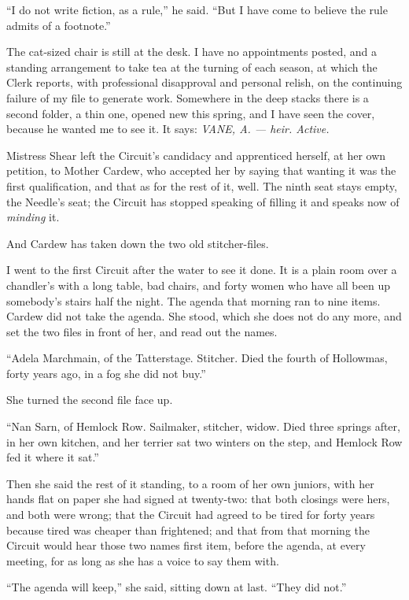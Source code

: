 ``I do not write fiction, as a rule,'' he said. ``But I have come to believe the rule admits of a footnote.''

The cat-sized chair is still at the desk. I have no appointments posted, and a standing arrangement to take tea at the turning of each season, at which the Clerk reports, with professional disapproval and personal relish, on the continuing failure of my file to generate work. Somewhere in the deep stacks there is a second folder, a thin one, opened new this spring, and I have seen the cover, because he wanted me to see it. It says: \emph{VANE, A. --- heir. Active.}

Mistress Shear left the Circuit's candidacy and apprenticed herself, at her own petition, to Mother Cardew, who accepted her by saying that wanting it was the first qualification, and that as for the rest of it, well. The ninth seat stays empty, the Needle's seat; the Circuit has stopped speaking of filling it and speaks now of \emph{minding} it.

And Cardew has taken down the two old stitcher-files.

I went to the first Circuit after the water to see it done. It is a plain room over a chandler's with a long table, bad chairs, and forty women who have all been up somebody's stairs half the night. The agenda that morning ran to nine items. Cardew did not take the agenda. She stood, which she does not do any more, and set the two files in front of her, and read out the names.

``Adela Marchmain, of the Tatterstage. Stitcher. Died the fourth of Hollowmas, forty years ago, in a fog she did not buy.''

She turned the second file face up.

``Nan Sarn, of Hemlock Row. Sailmaker, stitcher, widow. Died three springs after, in her own kitchen, and her terrier sat two winters on the step, and Hemlock Row fed it where it sat.''

Then she said the rest of it standing, to a room of her own juniors, with her hands flat on paper she had signed at twenty-two: that both closings were hers, and both were wrong; that the Circuit had agreed to be tired for forty years because tired was cheaper than frightened; and that from that morning the Circuit would hear those two names first item, before the agenda, at every meeting, for as long as she has a voice to say them with.

``The agenda will keep,'' she said, sitting down at last. ``They did not.''

